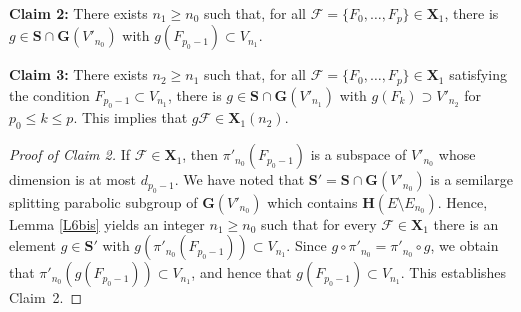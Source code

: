 \documentclass[12pt]{amsart}
\newcommand{\G}{\mathbf{G}}
\renewcommand{\H}{\mathbf{H}}
\newcommand{\X}{\mathbf{X}}
\newcommand{\Ff}{\mathcal{F}}
\numberwithin{equation}{section}
\theoremstyle{definition}
\begin{document}
\medskip
{\bf Claim 2:} There exists $n_1\geq n_0$ such that, for all $\Ff=\{F_0,\ldots,F_p\}\in\X_1$, there is $g\in\mathbf{S}\cap\G(V'_{n_0})$ with $g(F_{p_0-1})\subset V_{n_1}$.

\medskip
{\bf Claim 3:} There exists $n_2\geq n_1$ such that, for all $\Ff=\{F_0,\ldots,F_p\}\in\X_1$ satisfying the condition $F_{p_0-1}\subset V_{n_1}$, there is $g\in\mathbf{S}\cap\G(V'_{n_1})$ with $g(F_k)\supset V'_{n_2}$ for $p_0\leq k\leq p$. This implies that $g\Ff\in\X_1(n_2)$.

\begin{proof}[Proof of Claim 2]
If $\Ff\in\X_1$, then $\pi'_{n_0}(F_{p_0-1})$ is a subspace of $V'_{n_0}$ whose dimension is at most $d_{p_0-1}$.
We have noted that $\mathbf{S}'=\mathbf{S}\cap\G(V'_{n_0})$ is a semilarge splitting parabolic subgroup of $\G(V'_{n_0})$ which
contains $\H(E\setminus E_{n_0})$. 
Hence, Lemma \ref{L6bis} yields an integer $n_1\geq n_0$
such that for every $\Ff\in\X_1$ there is an element $g\in\mathbf{S}'$ with $g(\pi'_{n_0}(F_{p_0-1}))\subset V_{n_1}$.
Since $g\circ \pi'_{n_0}=\pi'_{n_0}\circ g$, we obtain that $\pi'_{n_0}(g(F_{p_0-1}))\subset V_{n_1}$, and hence that $g(F_{p_0-1})\subset V_{n_1}$. This establishes Claim~2.
\end{proof}
\end{document}
